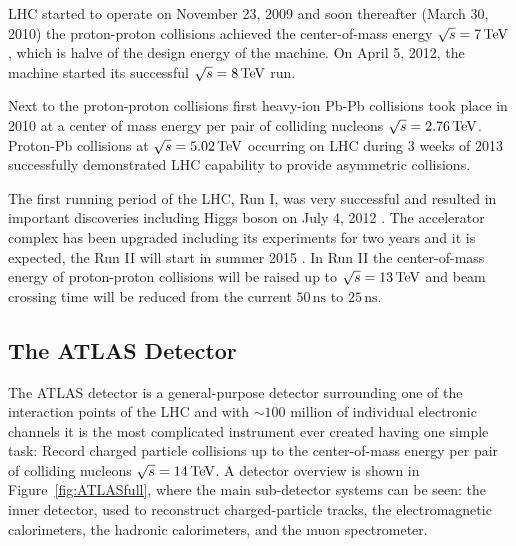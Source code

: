 LHC started to operate on November 23, 2009 and soon thereafter (March 30, 2010)
the proton-proton collisions achieved the center-of-mass energy $\sqrt{s} = 7
\,\text{TeV}$, which is halve of the design energy of the machine. On April 5, 2012, the
machine started its successful $\sqrt{s} = 8 \,\text{TeV}$ run.

Next to the proton-proton collisions first heavy-ion Pb-Pb collisions took place
in 2010 at a center of mass energy per pair of colliding nucleons $\sqrt{s} =
2.76 \,\text{TeV}$. Proton-Pb collisions at $\sqrt{s} = 5.02 \,\text{TeV}$ occurring on LHC
during 3 weeks of 2013 successfully demonstrated LHC capability to provide
asymmetric collisions.  

The first running period of the LHC, Run I, was very successful and resulted in
important discoveries including Higgs boson on July 4, 2012
\cite{HiggsDiscovery}.  The accelerator complex has been upgraded including its
experiments for two years and it is expected, the Run II will start in summer
2015 \cite{LHCFuture}. In Run II the center-of-mass energy of proton-proton
collisions will be raised up to $\sqrt{s} = 13 \,\text{TeV}$ and beam crossing time will
be reduced from the current $50\,\text{ns}$ to $25\,\text{ns}$.

\subsection{The ATLAS Detector}

The ATLAS detector \cite{ATLAS} is a general-purpose detector surrounding one of
the interaction points of the LHC and with $\sim 100$ million of individual
electronic channels it is the most complicated instrument ever created having
one simple task: Record charged particle collisions up to the center-of-mass
energy per pair of colliding nucleons $\sqrt{s} = 14 \,\text{TeV}$. A detector overview is
shown in Figure~\ref{fig:ATLASfull}, where the main sub-detector systems can be
seen: the inner detector, used to reconstruct charged-particle tracks, the
electromagnetic calorimeters, the hadronic calorimeters, and the muon
spectrometer. 

